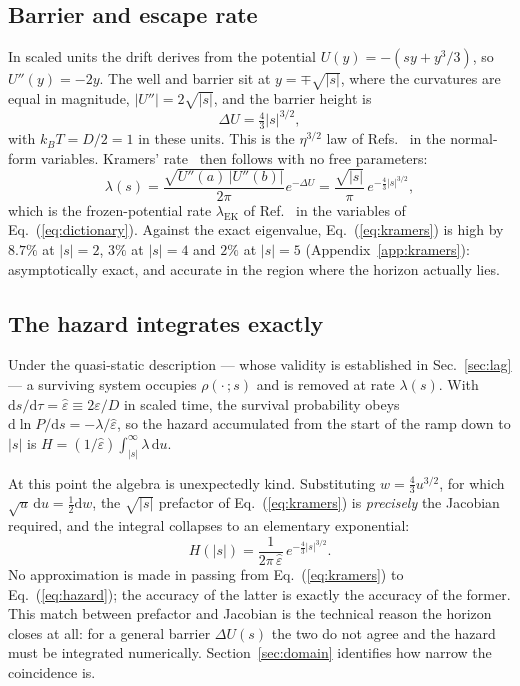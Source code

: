 \documentclass[%
 twocolumn,
 superscriptaddress,
 amsmath,amssymb,
 aps,
 pre,
 floatfix,
]{revtex4-2}
\newcommand{\dd}{\mathrm{d}}
\newcommand{\Sig}{\hat\varepsilon}
\begin{document}
\subsection{Barrier and escape rate}

In scaled units the drift derives from the potential $U(y)=-(sy+y^3/3)$, so $U''(y)=-2y$.  The well and barrier sit at $y=\mp\sqrt{|s|}$, where the curvatures are equal in magnitude, $|U''|=2\sqrt{|s|}$, and the barrier height is
\begin{equation}
\label{eq:barrier}
\Delta U=\tfrac43|s|^{3/2},
\end{equation}
with $k_BT=D/2=1$ in these units.  This is the $\eta^{3/2}$ law of Refs.~\cite{Kurkijarvi1972,DykmanKrivoglaz1980,Victora1989,DykmanGoldingRyvkine2004} in the normal-form variables.  Kramers' rate~\cite{Kramers1940,Hanggi1990} then follows with no free parameters:
\begin{equation}
\label{eq:kramers}
\lambda(s)=\frac{\sqrt{U''(a)\,|U''(b)|}}{2\pi}e^{-\Delta U}
=\frac{\sqrt{|s|}}{\pi}\,e^{-\frac43|s|^{3/2}} ,
\end{equation}
which is the frozen-potential rate $\lambda_{\mathrm{EK}}$ of Ref.~\cite{HerbertBouchet2017} in the variables of Eq.~(\ref{eq:dictionary}).  Against the exact eigenvalue, Eq.~(\ref{eq:kramers}) is high by $8.7\%$ at $|s|=2$, $3\%$ at $|s|=4$ and $2\%$ at $|s|=5$ (Appendix~\ref{app:kramers}): asymptotically exact, and accurate in the region where the horizon actually lies.

\subsection{The hazard integrates exactly}

Under the quasi-static description --- whose validity is established in Sec.~\ref{sec:lag} --- a surviving system occupies $\rho(\cdot\,;s)$ and is removed at rate $\lambda(s)$.  With $\dd s/\dd\tau=\Sig\equiv2\varepsilon/D$ in scaled time, the survival probability obeys $\dd\ln P/\dd s=-\lambda/\Sig$, so the hazard accumulated from the start of the ramp down to $|s|$ is $H=(1/\Sig)\int_{|s|}^{\infty}\lambda\,\dd u$.

At this point the algebra is unexpectedly kind.  Substituting $w=\tfrac43u^{3/2}$, for which $\sqrt u\,\dd u=\tfrac12\dd w$, the $\sqrt{|s|}$ prefactor of Eq.~(\ref{eq:kramers}) is \emph{precisely} the Jacobian required, and the integral collapses to an elementary exponential:
\begin{equation}
\label{eq:hazard}
H(|s|)=\frac{1}{2\pi\,\Sig}\,e^{-\frac43|s|^{3/2}} .
\end{equation}
No approximation is made in passing from Eq.~(\ref{eq:kramers}) to Eq.~(\ref{eq:hazard}); the accuracy of the latter is exactly the accuracy of the former.  This match between prefactor and Jacobian is the technical reason the horizon closes at all: for a general barrier $\Delta U(s)$ the two do not agree and the hazard must be integrated numerically.  Section~\ref{sec:domain} identifies how narrow the coincidence is.
\end{document}
